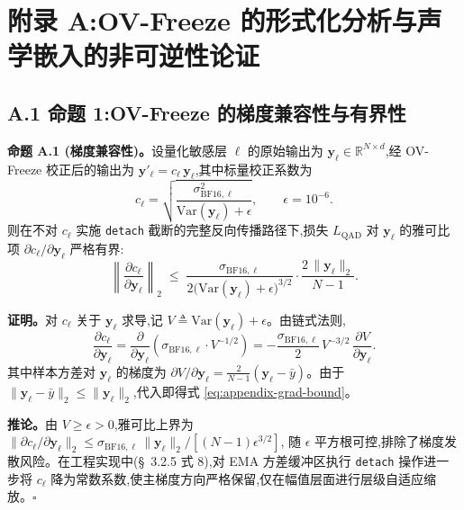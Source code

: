 \documentclass[11pt, a4paper]{article}
\begin{document}
\newpage


\appendix
\section*{附录 A:OV-Freeze 的形式化分析与声学嵌入的非可逆性论证}

\subsection*{A.1 命题 1:OV-Freeze 的梯度兼容性与有界性}

\noindent\textbf{命题 A.1 (梯度兼容性)。}\quad 设量化敏感层 $\ell$ 的原始输出为 $\bm{y}_\ell\in\mathbb{R}^{N\times d}$,经 OV-Freeze 校正后的输出为 $\bm{y}'_\ell = c_\ell\,\bm{y}_\ell$,其中标量校正系数为
\[
c_\ell = \sqrt{\frac{\sigma^2_{\mathrm{BF16},\ell}}{\mathrm{Var}(\bm{y}_\ell)+\epsilon}},
\qquad \epsilon = 10^{-6}.
\]
则在不对 $c_\ell$ 实施 \texttt{detach} 截断的完整反向传播路径下,损失 $L_{\mathrm{QAD}}$ 对 $\bm{y}_\ell$ 的雅可比项 $\partial c_\ell/\partial\bm{y}_\ell$ 严格有界:
\begin{equation}
\label{eq:appendix-grad-bound}
\left\|\frac{\partial c_\ell}{\partial \bm{y}_\ell}\right\|_2
\;\le\;
\frac{\sigma_{\mathrm{BF16},\ell}}{2\bigl(\mathrm{Var}(\bm{y}_\ell)+\epsilon\bigr)^{3/2}}
\cdot
\frac{2\,\|\bm{y}_\ell\|_2}{N-1}.
\end{equation}

\noindent\textbf{证明。}\quad 对 $c_\ell$ 关于 $\bm{y}_\ell$ 求导,记 $V \triangleq \mathrm{Var}(\bm{y}_\ell)+\epsilon$。由链式法则,
\[
\frac{\partial c_\ell}{\partial \bm{y}_\ell}
=
\frac{\partial}{\partial \bm{y}_\ell}\!
\left(\sigma_{\mathrm{BF16},\ell}\cdot V^{-1/2}\right)
=
-\frac{\sigma_{\mathrm{BF16},\ell}}{2}\,V^{-3/2}\,\frac{\partial V}{\partial \bm{y}_\ell}.
\]
其中样本方差对 $\bm{y}_\ell$ 的梯度为 $\partial V/\partial \bm{y}_\ell = \frac{2}{N-1}(\bm{y}_\ell-\bar{y})$。由于 $\|\bm{y}_\ell-\bar y\|_2\le\|\bm{y}_\ell\|_2$,代入即得式 \eqref{eq:appendix-grad-bound}。

\noindent\textbf{推论。}\quad 由 $V\ge\epsilon>0$,雅可比上界为
$\|\partial c_\ell/\partial\bm{y}_\ell\|_2 \le \sigma_{\mathrm{BF16},\ell}\,\|\bm{y}_\ell\|_2/[(N-1)\epsilon^{3/2}]$,
随 $\epsilon$ 平方根可控,排除了梯度发散风险。在工程实现中(\S~3.2.5 式 8),对 EMA 方差缓冲区执行 \texttt{detach} 操作进一步将 $c_\ell$ 降为常数系数,使主梯度方向严格保留,仅在幅值层面进行层级自适应缩放。\hfill$\square$
\end{document}
